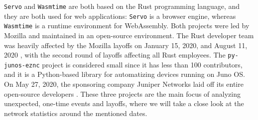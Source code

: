 \begin{table}
    \centering
        \caption{Collaboration analysis projects and basic statistics.}
        \label{tab:projects}
\end{table}

\texttt{Servo} and \texttt{Wasmtime} are both based on the Rust programming language, and they are both used for web applications: \texttt{Servo} is a browser engine, whereas \texttt{Wasmtime} is a runtime environment for WebAssembly. Both projects were led by Mozilla and maintained in an open-source environment. The Rust developer team was heavily affected by the Mozilla layoffs on January 15, 2020, and August 11, 2020 \cite{lardinoisMozillaLays70,kastrenakesMozillaLaying2502020}, with the second round of layoffs affecting all Rust employees. The \texttt{py-junos-eznc} project is considered small since it has less than 100 contributors, and it is a Python-based library for automatizing devices running on Juno OS. On May 27, 2020, the sponsoring company Juniper Networks laid off its entire open-source developers \cite{brasseurFarewellJuniperNetworks2020}. These three projects are the main focus of analyzing unexpected, one-time events and layoffs, where we will take a close look at the network statistics around the mentioned dates.

